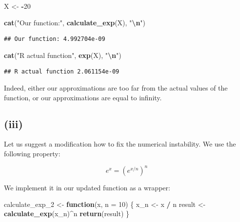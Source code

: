 \documentclass[
]{article}
\newenvironment{Shaded}{\begin{snugshade}}{\end{snugshade}}
\newcommand{\AttributeTok}[1]{\textcolor[rgb]{0.13,0.29,0.53}{#1}}
\newcommand{\ControlFlowTok}[1]{\textcolor[rgb]{0.13,0.29,0.53}{\textbf{#1}}}
\newcommand{\DecValTok}[1]{\textcolor[rgb]{0.00,0.00,0.81}{#1}}
\newcommand{\FunctionTok}[1]{\textcolor[rgb]{0.13,0.29,0.53}{\textbf{#1}}}
\newcommand{\NormalTok}[1]{#1}
\newcommand{\OtherTok}[1]{\textcolor[rgb]{0.56,0.35,0.01}{#1}}
\newcommand{\SpecialCharTok}[1]{\textcolor[rgb]{0.81,0.36,0.00}{\textbf{#1}}}
\newcommand{\StringTok}[1]{\textcolor[rgb]{0.31,0.60,0.02}{#1}}
\begin{document}
\begin{Shaded}
\begin{Highlighting}[]
\NormalTok{X }\OtherTok{\textless{}{-}} \SpecialCharTok{{-}}\DecValTok{20}

\FunctionTok{cat}\NormalTok{(}\StringTok{"Our function:"}\NormalTok{, }\FunctionTok{calculate\_exp}\NormalTok{(X), }\StringTok{"}\SpecialCharTok{\textbackslash{}n}\StringTok{"}\NormalTok{)}
\end{Highlighting}
\end{Shaded}

\begin{verbatim}
## Our function: 4.992704e-09
\end{verbatim}

\begin{Shaded}
\begin{Highlighting}[]
\FunctionTok{cat}\NormalTok{(}\StringTok{"R actual function"}\NormalTok{, }\FunctionTok{exp}\NormalTok{(X), }\StringTok{"}\SpecialCharTok{\textbackslash{}n}\StringTok{"}\NormalTok{)}
\end{Highlighting}
\end{Shaded}

\begin{verbatim}
## R actual function 2.061154e-09
\end{verbatim}

Indeed, either our approximations are too far from the actual values of
the function, or our approximations are equal to infinity.

\subsection{(iii)}\label{iii}

Let us suggest a modification how to fix the numerical instability. We
use the following property:

\[
e^{x} = \left(e^{x/n}\right)^n
\]

We implement it in our updated function as a wrapper:

\begin{Shaded}
\begin{Highlighting}[]
\NormalTok{calculate\_exp\_2 }\OtherTok{\textless{}{-}} \ControlFlowTok{function}\NormalTok{(x, }\AttributeTok{n =} \DecValTok{10}\NormalTok{) \{}
\NormalTok{    x\_n }\OtherTok{\textless{}{-}}\NormalTok{ x }\SpecialCharTok{/}\NormalTok{ n}
\NormalTok{    result }\OtherTok{\textless{}{-}} \FunctionTok{calculate\_exp}\NormalTok{(x\_n)}\SpecialCharTok{\^{}}\NormalTok{n}
    \FunctionTok{return}\NormalTok{(result)}
\NormalTok{\}}
\end{Highlighting}
\end{Shaded}
\end{document}
